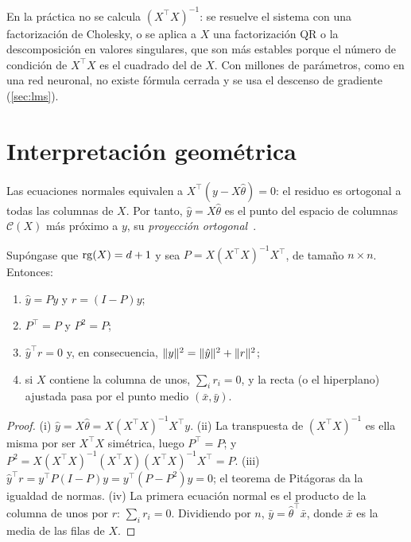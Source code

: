\begin{observacion}
En la práctica no se calcula $(X^{\top}X)^{-1}$: se resuelve el sistema con una factorización de Cholesky, o se aplica a $X$ una factorización QR o la descomposición en valores singulares, que son más estables porque el número de condición de $X^{\top}X$ es el cuadrado del de $X$. Con millones de parámetros, como en una red neuronal, no existe fórmula cerrada y se usa el descenso de gradiente (\cref{sec:lms}).
\end{observacion}

\section{Interpretación geométrica}

Las ecuaciones normales equivalen a $X^{\top}(y-X\hat\theta)=0$: el residuo es ortogonal a todas las columnas de $X$. Por tanto, $\hat y=X\hat\theta$ es el punto del espacio de columnas $\mathcal{C}(X)$ más próximo a $y$, su \emph{proyección ortogonal}~\cite[§4.2--4.3]{strang}.

\begin{proposicion}\label{prop:proyeccion}
Supóngase que $\operatorname{rg}(X)=d+1$ y sea $P=X(X^{\top}X)^{-1}X^{\top}$, de tamaño $n\times n$. Entonces:
\begin{enumerate}
  \item $\hat y=Py$ y $r=(I-P)y$;
  \item $P^{\top}=P$ y $P^{2}=P$;
  \item $\hat y^{\top}r=0$ y, en consecuencia, $\lVert y\rVert^{2}=\lVert\hat y\rVert^{2}+\lVert r\rVert^{2}$;
  \item si $X$ contiene la columna de unos, $\sum_i r_i=0$, y la recta (o el hiperplano) ajustada pasa por el punto medio $(\bar x,\bar y)$.
\end{enumerate}
\end{proposicion}

\begin{proof}
(i) $\hat y=X\hat\theta=X(X^{\top}X)^{-1}X^{\top}y$. (ii) La transpuesta de $(X^{\top}X)^{-1}$ es ella misma por ser $X^{\top}X$ simétrica, luego $P^{\top}=P$; y $P^{2}=X(X^{\top}X)^{-1}(X^{\top}X)(X^{\top}X)^{-1}X^{\top}=P$. (iii) $\hat y^{\top}r=y^{\top}P(I-P)y=y^{\top}(P-P^{2})y=0$; el teorema de Pitágoras da la igualdad de normas. (iv) La primera ecuación normal es el producto de la columna de unos por $r$: $\sum_i r_i=0$. Dividiendo por $n$, $\bar y=\hat\theta^{\top}\bar x$, donde $\bar x$ es la media de las filas de $X$.
\end{proof}


